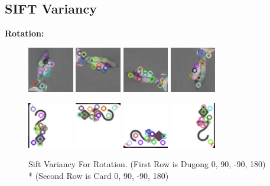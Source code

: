 \documentclass[conference]{IEEEtran}
\begin{document}
\subsection{SIFT Variancy}
\textbf{Rotation: }
\begin{figure}[H]
    \centerline{
        {\includegraphics[width=20mm, scale=0.5]{./figures/task 2/dugong-sift.png}}
        {\includegraphics[width=20mm, scale=0.5]{./figures/task 2/dugong90-sift.png}}
        {\includegraphics[width=20mm, scale=0.5]{./figures/task 2/dugongn90-sift.png}}
        {\includegraphics[width=20mm, scale=0.5]{./figures/task 2/dugong180-sift.png}}
    }
    \centerline{
        {\includegraphics[width=20mm, scale=0.5]{./figures/task 2/card-sift.png}}
        {\includegraphics[width=20mm, scale=0.5]{./figures/task 2/card90-sift.png}}
        {\includegraphics[width=20mm, scale=0.5]{./figures/task 2/cardn90-sift.png}}
        {\includegraphics[width=20mm, scale=0.5]{./figures/task 2/card180-sift.png}}
    }
    \caption{Sift Variancy For Rotation. (First Row is Dugong 0\degree, 90\degree, -90\degree, 180\degree)\\*
    (Second Row is Card 0\degree, 90\degree, -90\degree, 180\degree)}
    \label{fig}
\end{figure}
\end{document}
